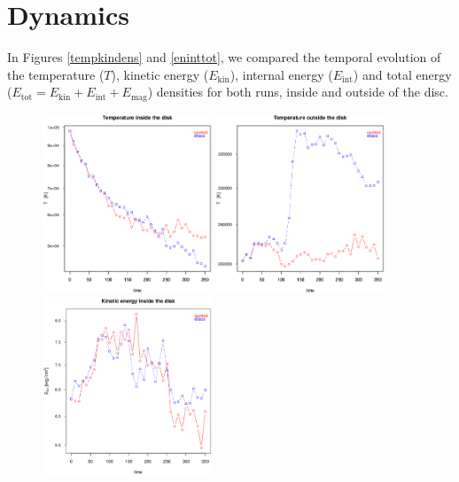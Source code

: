 \documentclass[a4paper,12pt]{article}
\begin{document}
\section{Dynamics}
In Figures \ref{tempkindens} and \ref{eninttot}, we compared the temporal evolution of the temperature ($T$), kinetic energy ($E_{\text{kin}}$), internal energy ($E_{\text{int}}$) and total energy 
($E_{\text{tot}}=E_{\text{kin}}+E_{\text{int}}+E_{\text{mag}}$) densities for both runs, inside and outside of the disc.
\begin{figure}[!ht]
 \begin{center}
  \includegraphics[width=0.45\textwidth]{figs/temp_vs_t_disco.eps}
  \includegraphics[width=0.45\textwidth]{figs/temp_vs_t_outside.eps}
  \includegraphics[width=0.45\textwidth]{figs/enkin_vs_t_disco.eps}

\end{center}
\end{figure}
\end{document}
